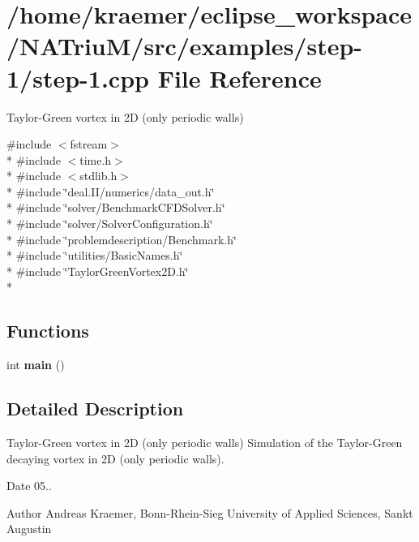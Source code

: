 \hypertarget{step-1_8cpp}{\section{/home/kraemer/eclipse\-\_\-workspace/\-N\-A\-Triu\-M/src/examples/step-\/1/step-\/1.cpp File Reference}
\label{step-1_8cpp}
}


Taylor-\/\-Green vortex in 2\-D (only periodic walls)  


{\ttfamily \#include $<$fstream$>$}\\*
{\ttfamily \#include $<$time.\-h$>$}\\*
{\ttfamily \#include $<$stdlib.\-h$>$}\\*
{\ttfamily \#include \char`\"{}deal.\-I\-I/numerics/data\-\_\-out.\-h\char`\"{}}\\*
{\ttfamily \#include \char`\"{}solver/\-Benchmark\-C\-F\-D\-Solver.\-h\char`\"{}}\\*
{\ttfamily \#include \char`\"{}solver/\-Solver\-Configuration.\-h\char`\"{}}\\*
{\ttfamily \#include \char`\"{}problemdescription/\-Benchmark.\-h\char`\"{}}\\*
{\ttfamily \#include \char`\"{}utilities/\-Basic\-Names.\-h\char`\"{}}\\*
{\ttfamily \#include \char`\"{}Taylor\-Green\-Vortex2\-D.\-h\char`\"{}}\\*
\subsection*{Functions}
\begin{DoxyCompactItemize}
\item 
\hypertarget{step-1_8cpp_ae66f6b31b5ad750f1fe042a706a4e3d4}{int {\bfseries main} ()}\label{step-1_8cpp_ae66f6b31b5ad750f1fe042a706a4e3d4}

\end{DoxyCompactItemize}


\subsection{Detailed Description}
Taylor-\/\-Green vortex in 2\-D (only periodic walls) Simulation of the Taylor-\/\-Green decaying vortex in 2\-D (only periodic walls).

\begin{DoxyDate}{Date}
05.. 
\end{DoxyDate}
\begin{DoxyAuthor}{Author}
Andreas Kraemer, Bonn-\/\-Rhein-\/\-Sieg University of Applied Sciences, Sankt Augustin 
\end{DoxyAuthor}
